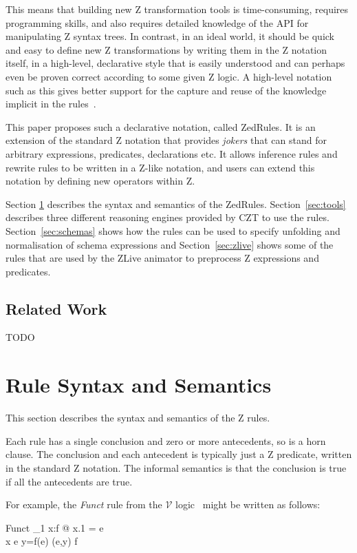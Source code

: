 \documentclass{entcs}
\newcommand{\V}{\mathcal{V}}
\begin{document}
This means that building new Z transformation tools is time-consuming,
requires programming skills, and also requires detailed knowledge of the
API for manipulating Z syntax trees.  In contrast, in an ideal world, it
should be quick and easy to define new Z transformations by writing them in
the Z notation itself, in a high-level, declarative style that is easily
understood and can perhaps even be proven correct according to some given Z
logic.  A high-level notation such as this gives better support for the
capture and reuse of the knowledge implicit in the
rules~\cite{armour:business-model00}.

This paper proposes such a declarative notation, called ZedRules.  It
is an extension of the standard Z notation that provides \emph{jokers}
that can stand for arbitrary expressions, predicates, declarations
etc.  It allows inference rules and rewrite rules to be written in a
Z-like notation, and users can extend this notation by defining new
operators within Z.

Section \ref{sec:syntax} describes the syntax and semantics of the
ZedRules.  Section~\ref{sec:tools} describes three different reasoning
engines provided by CZT to use the rules.  Section~\ref{sec:schemas} shows
how the rules can be used to specify unfolding and normalisation of schema
expressions and Section~\ref{sec:zlive} shows some of the rules that are
used by the ZLive animator to preprocess Z expressions and predicates.



\subsection{Related Work} \label{sec:relwork}

TODO


\section{Rule Syntax and Semantics} \label{sec:syntax}

This section describes the syntax and semantics of the Z rules.

Each rule has a single conclusion and zero or more antecedents, so is a
horn clause.  The conclusion and each antecedent is typically just a Z
predicate, written in the standard Z notation.  The informal semantics
is that the conclusion is true if all the antecedents are true.

For example, the \emph{Funct} rule from the $\V$ logic~\cite{}
might be written as follows:
\begin{zedrule}{Funct}
  \exists_1 x:f @ x.1 = e \\
  x \notfreein e
\derives
  y=f(e) \iff (e,y) \in f
\end{zedrule}
\end{document}
